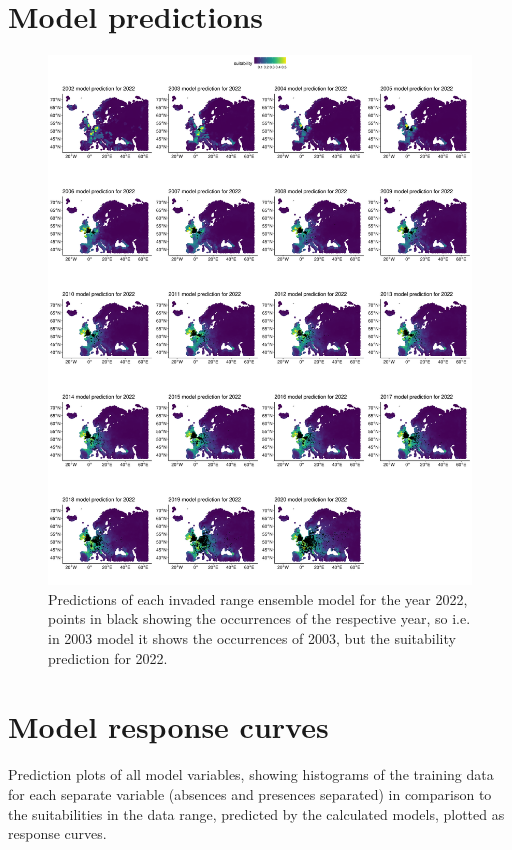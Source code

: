 \section{Model predictions}
\begin{figure}[!h]
    \caption{\label{fig:all_mod_preds} Predictions of each invaded range ensemble model for the year 2022, points in black showing the occurrences of the respective year, so i.e. in 2003 model it shows the occurrences of 2003, but the suitability prediction for 2022.}
    \centerline{
        \includegraphics[width = 0.85\paperwidth, height = 0.6\paperheight]{"../../R/figures/2003to2021-mod-pred.png"}
    }
\end{figure}

\section{Model response curves} \label{sec:response_curves}

Prediction plots of all model variables, showing histograms of the training data for each separate variable (absences and presences separated) in comparison to the suitabilities in the data range, predicted by the calculated models, plotted as response curves.

